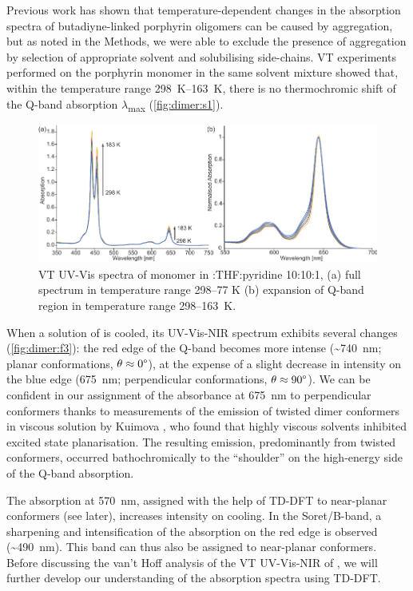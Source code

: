 		Previous work has shown that temperature-dependent changes in the absorption spectra of butadiyne-linked porphyrin oligomers can be caused by aggregation,\autocite{Karnbratt2012,Hutin2013} but as noted in the Methods, we were able to exclude the presence of aggregation by selection of appropriate solvent and solubilising side-chains. VT experiments performed on the porphyrin monomer  in the same solvent mixture showed that, within the temperature range \SIrange{298}{163}{\kelvin}, there is no thermochromic shift of the Q-band absorption $\lambda$\textsubscript{max} (\autoref{fig:dimer:s1}).

		\begin{figure}[ht!]
			\centering\includegraphics{figures/dimer/si-p1-vt-f1.pdf} 
			\caption[]{VT UV-­Vis spectra of monomer  in :THF:pyridine 10:10:1, (a) full spectrum in temperature range
				298–77 K (b) expansion of Q-­band region in temperature range 298–\SI{163}{\kelvin}.}
			\label{fig:dimer:s1}
		\end{figure}

		When a solution of  is cooled, its UV-Vis-NIR spectrum exhibits several changes (\autoref{fig:dimer:f3}): the red edge of the Q-band becomes more intense (\textasciitilde{}\SI{740}{\nano\metre}; planar conformations, $\theta \approx 0\degree$), at the expense of a slight decrease in intensity on the blue edge (\SI{675}{\nano\metre}; perpendicular conformations, $\theta \approx 90\degree$). We can be confident in our assignment of the absorbance at \SI{675}{\nano\metre} to perpendicular conformers thanks to measurements of the emission of twisted dimer conformers in viscous solution by Kuimova \autocite{Kuimova2009b}, who found that highly viscous solvents inhibited excited state planarisation. The resulting emission, predominantly from twisted conformers, occurred bathochromically to the “shoulder” on the high-energy side of the Q-band absorption. 

		The absorption at \SI{570}{\nano\metre}, assigned with the help of TD-DFT to near-planar conformers (see later), increases intensity on cooling. In the Soret/B-band, a sharpening and intensification of the absorption on the red edge is observed (\textasciitilde{}\SI{490}{\nano\metre}). This band can thus also be assigned to near-planar conformers. Before discussing the van't Hoff analysis of the VT UV-Vis-NIR of , we will further develop our understanding of the absorption spectra using TD-DFT\@.
		\FloatBarrier
